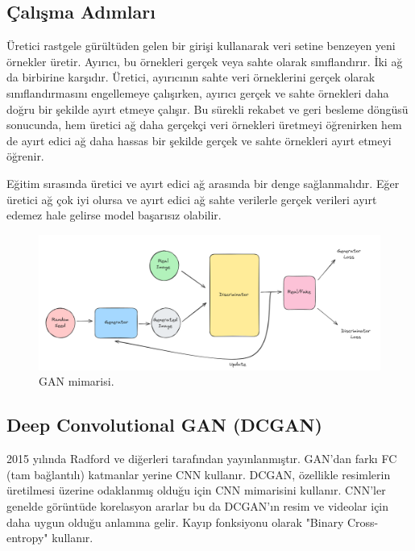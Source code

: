 \subsection{Çalışma Adımları}
Üretici rastgele gürültüden gelen bir girişi kullanarak veri setine benzeyen yeni örnekler üretir. Ayırıcı, bu örnekleri gerçek veya sahte olarak sınıflandırır. İki ağ da birbirine karşıdır. Üretici, ayırıcının sahte veri örneklerini gerçek olarak sınıflandırmasını engellemeye çalışırken, ayırıcı gerçek ve sahte örnekleri daha doğru bir şekilde ayırt etmeye çalışır. Bu sürekli rekabet ve geri besleme döngüsü sonucunda, hem üretici ağ daha gerçekçi veri örnekleri üretmeyi öğrenirken hem de ayırt edici ağ daha hassas bir şekilde gerçek ve sahte örnekleri ayırt etmeyi öğrenir.

Eğitim sırasında üretici ve ayırt edici ağ arasında bir denge sağlanmalıdır. Eğer üretici ağ çok iyi olursa ve ayırt edici ağ sahte verilerle gerçek verileri ayırt edemez hale gelirse model başarısız olabilir. 

\begin{figure}[h]
    \centering
    \includegraphics[width=1\textwidth]{images/gan_architecture.png}
    \caption{GAN mimarisi.}
    \label{fig:enter-label}
\end{figure}

\subsection{Deep Convolutional GAN (DCGAN)}
2015 yılında Radford ve diğerleri tarafından yayınlanmıştır. GAN'dan farkı FC (tam bağlantılı) katmanlar yerine CNN kullanır. DCGAN, özellikle resimlerin üretilmesi üzerine odaklanmış olduğu için CNN mimarisini kullanır. CNN'ler genelde görüntüde korelasyon ararlar bu da DCGAN'ın resim ve videolar için daha uygun olduğu anlamına gelir. Kayıp fonksiyonu olarak "Binary Cross-entropy" kullanır.

